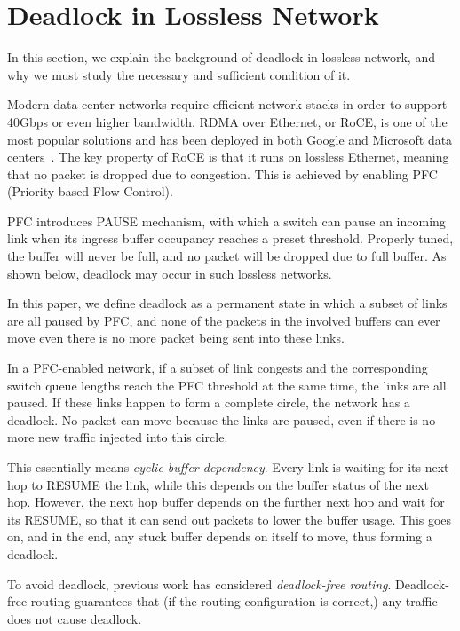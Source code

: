 \secspace
\section{Deadlock in Lossless Network}
\secspace

In this section, we explain the background of deadlock in lossless network, and 
why we must study the necessary and sufficient condition of it.

Modern data center networks require efficient network stacks in order to support 
40Gbps or even higher bandwidth. RDMA over Ethernet, or RoCE, is one of the most popular
solutions and has been deployed in both Google and Microsoft data centers~\cite{dcqcn, timely}.
The key property of RoCE is that it runs on lossless Ethernet, meaning
that no packet is dropped due to congestion. This is achieved by enabling PFC 
(Priority-based Flow Control).

PFC introduces PAUSE mechanism, with which a switch can pause an incoming link
when its ingress buffer occupancy reaches a preset threshold. Properly tuned, the 
buffer will never be full, and no packet will be dropped due to full buffer.
As shown below, deadlock may occur in such lossless networks.


In this paper, we define deadlock as a permanent state in which a subset of links are all paused
by PFC, and none of the packets in the involved buffers can ever move even there is 
no more packet being sent into these links.

In a PFC-enabled network, if a subset of link congests and the corresponding switch queue lengths reach
the PFC threshold at the same time, the links are all paused. If these links happen
to form a complete circle, the network has a deadlock. No packet can move because 
the links are paused, even if there is no more new traffic injected into this circle.

This essentially means {\em cyclic buffer dependency}. Every link is waiting for its next
hop to RESUME the link, while this depends on the buffer status of the next hop. However,
the next hop buffer depends on the further next hop and wait for its RESUME,
so that it can send out packets to lower the buffer usage. This goes on, and in the end, 
any stuck buffer depends on itself to move, thus forming a deadlock.

To avoid deadlock, previous work has considered {\em deadlock-free routing}. Deadlock-free
routing guarantees that (if the routing configuration is correct,) any traffic does not
cause deadlock.

